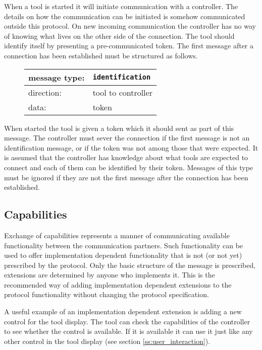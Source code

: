 \documentclass{article}
\newcommand{\msg}[1]{\texttt{#1}}
\begin{document}
   When a tool is started it will initiate communication with a controller.
   The details on how the communication can be initiated is somehow
   communicated outside this protocol. On new incoming communication the
   controller has no way of knowing what lives on the other side of the
   connection. The tool should identify itself by presenting a pre-communicated
   token. The first message after a connection has been established must be
   structured as follows.
   
   \begin{figure}[H]
    \begin{center}
     \begin{tabular}{|ll|}
      \hline
      message type:    & \msg{identification} \\
      \hline
      direction:       & tool to controller \\
      data:            & token \\
      \hline
     \end{tabular}
    \end{center}
   \end{figure}

   \noindent When started the tool is given a token which it should sent as
   part of this message. The controller must sever the connection if the first
   message is not an identification message, or if the token was not among
   those that were expected. It is assumed that the controller has knowledge
   about what tools are expected to connect and each of them can be identified
   by their token.  Messages of this type must be ignored if they are not the
   first message after the connection has been established.

  \subsection{Capabilities}

   Exchange of capabilities represents a manner of communicating available
   functionality between the communication partners.  Such functionality can be
   used to offer implementation dependent functionality that is not (or not
   yet) prescribed by the protocol. Only the basic structure of the message is
   prescribed, extensions are determined by anyone who implements it. This is the
   recommended way of adding implementation dependent extensions to the
   protocol functionality without changing the protocol specification.

   A useful example of an implementation dependent extension is adding a new
   control for the tool display. The tool can check the capabilities of the
   controller to see whether the control is available. If it is available it
   can use it just like any other control in the tool display (see section
   \ref{ss:user_interaction}).
\end{document}
